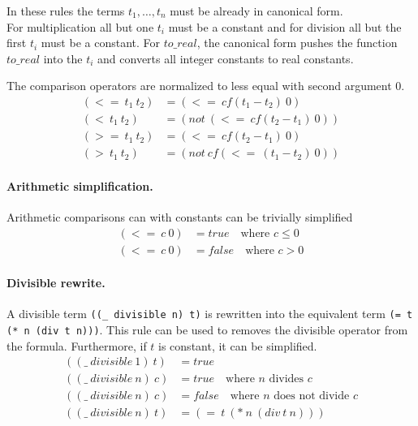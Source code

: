 \documentclass[a4paper]{article}
\newcommand\cf{\mathit{cf}}
\begin{document}
In these rules the terms $t_1,\dots,t_n$ must be already in canonical form.\\
For multiplication all but one $t_i$ must be a constant and
for division all but the first $t_i$ must be a constant.
For $to\_real$, the canonical form pushes the function $to\_real$ into
the $t_i$ and converts all integer constants to real constants.

The comparison operators are normalized to less equal with second argument 0.
\begin{align}
  (<=\ t_1\ t_2) &= (<=\ \cf(t_1-t_2)\ 0) \tag{leqToLeq0}\\
  (<\ t_1\ t_2)  &= (not\ (<=\ \cf(t_2-t_1)\ 0)) \tag{ltToLeq0}\\
  (>=\ t_1\ t_2) &= (<=\ \cf(t_2-t_1)\ 0) \tag{geqToLeq0}\\
  (>\ t_1\ t_2)  &= (not\ \cf(<=\ (t_1-t_2)\ 0)) \tag{gtToLeq0}
\end{align}

\paragraph{Arithmetic simplification.}  Arithmetic comparisons
can with constants can be trivially simplified
\begin{align}
  (<=\ c\ 0) &= true  \quad \text{where $c \leq 0$}\tag{leqTrue}\\
  (<=\ c\ 0) &= false \quad  \text{where $c > 0$}\tag{leqFalse}
\end{align}

\paragraph{Divisible rewrite.}  A divisible term
\verb+((_ divisible n) t)+ is rewritten into the equivalent term
\verb+(= t (* n (div t n)))+.  This rule can be used to
removes the divisible operator from the formula.
Furthermore, if $t$ is constant, it can be simplified.
\begin{equation}
  \begin{aligned}
    ((\_\ divisible\ 1)\ t) &= true\\
    ((\_\ divisible\ n)\ c) &= true \quad \text{where $n$ divides $c$}\\
    ((\_\ divisible\ n)\ c) &= false \quad \text{where $n$ does not divide $c$}\\
    ((\_\ divisible\ n)\ t) &= (=\ t\ (*\ n\ (div\ t\ n)))
  \end{aligned} \tag{divisible}
\end{equation}
\end{document}
